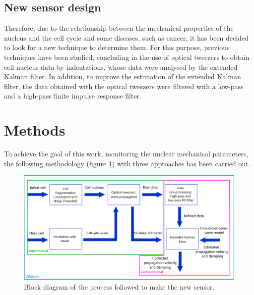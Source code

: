 \documentclass[12pt, a4paper]{article} %
\begin{document}
	\setlength{\parskip}{0mm}
	
	\subsection{New sensor design}
	
	Therefore, due to the relationship between the mechanical properties of the nucleus and the cell cycle and some diseases, such as cancer, it has been decided to look for a new technique to determine them. For this purpose, previous techniques have been studied, concluding in the use of optical tweezers to obtain cell nucleus data by indentations, whose data were analysed by the extended Kalman filter. In addition, to improve the estimation of the extended Kalman filter, the data obtained with the optical tweezers were filtered with a low-pass and a high-pass finite impulse response filter.
	
	\setlength{\parskip}{4mm}
	
	\newpage
	\setlength{\parskip}{0mm}
	
	\section{Methods}
	
	To achieve the goal of this work, monitoring the nuclear mechanical parameters, the following methodology (figure \ref{fig:esquema_trabajo}) with three approaches has been carried out.
	
	\setlength{\parskip}{4mm}
	
	\begin{figure}[htbp]
		\centering
		\includegraphics[width=1\textwidth]{figures/esquema_trabajo_metodos_2.png}
		\caption{Block diagram of the process followed to make the new sensor.}
		\label{fig:esquema_trabajo}
	\end{figure}
	
\end{document}
